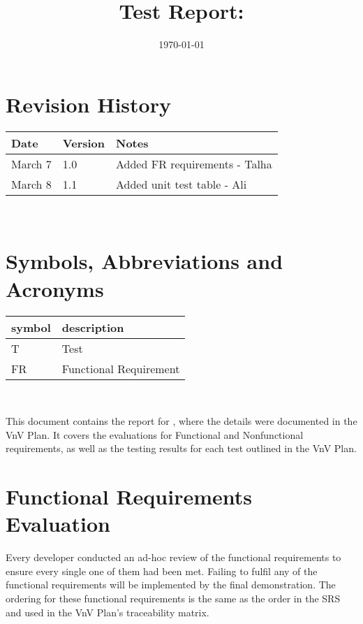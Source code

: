 \documentclass[12pt, titlepage]{article}
\begin{document}
\title{Test Report: \progname} 
\author{\authname}
\date{\today}
	
\maketitle


\section{Revision History}

\begin{tabularx}{\textwidth}{p{3cm}p{2cm}X}
\toprule {\bf Date} & {\bf Version} & {\bf Notes}\\
\midrule
March 7 & 1.0 & Added FR requirements - Talha\\
March 8 & 1.1 & Added unit test table - Ali\\
\bottomrule
\end{tabularx}

~\newpage

\section{Symbols, Abbreviations and Acronyms}

\renewcommand{\arraystretch}{1.2}
\begin{tabular}{l l} 
  \toprule		
  \textbf{symbol} & \textbf{description}\\
  \midrule 
  T & Test\\
  FR & Functional Requirement\\
  \bottomrule
\end{tabular}\\

\newpage

\tableofcontents

\listoftables %

\listoffigures %

\newpage


This document contains the report for \progname , where the details were documented in the VnV Plan. It covers the evaluations for Functional and Nonfunctional requirements, as well as the testing results for each test outlined in the VnV Plan.

\section{Functional Requirements Evaluation}
Every developer conducted an ad-hoc review of the functional requirements to ensure every single one of them had been met. Failing to fulfil any of the functional requirements will be implemented by the final demonstration. The ordering for these functional requirements is the same as the order in the SRS and used in the VnV Plan's traceability matrix.
\end{document}
